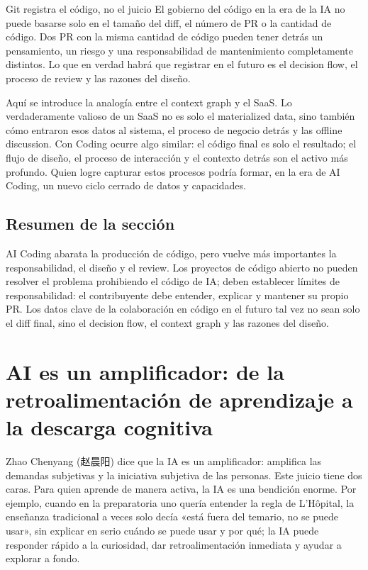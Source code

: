 \documentclass[a4paper]{article}
\begin{document}
\begin{warningbox}{Git registra el código, no el juicio}
El gobierno del código en la era de la IA no puede basarse solo en el tamaño del diff, el número de PR o la cantidad de código. Dos PR con la misma cantidad de código pueden tener detrás un pensamiento, un riesgo y una responsabilidad de mantenimiento completamente distintos. Lo que en verdad habrá que registrar en el futuro es el decision flow, el proceso de review y las razones del diseño.
\end{warningbox}

Aquí se introduce la analogía entre el context graph y el SaaS. Lo verdaderamente valioso de un SaaS no es solo el materialized data, sino también cómo entraron esos datos al sistema, el proceso de negocio detrás y las offline discussion. Con Coding ocurre algo similar: el código final es solo el resultado; el flujo de diseño, el proceso de interacción y el contexto detrás son el activo más profundo. Quien logre capturar estos procesos podría formar, en la era de AI Coding, un nuevo ciclo cerrado de datos y capacidades.

\subsection{Resumen de la sección}

AI Coding abarata la producción de código, pero vuelve más importantes la responsabilidad, el diseño y el review. Los proyectos de código abierto no pueden resolver el problema prohibiendo el código de IA; deben establecer límites de responsabilidad: el contribuyente debe entender, explicar y mantener su propio PR. Los datos clave de la colaboración en código en el futuro tal vez no sean solo el diff final, sino el decision flow, el context graph y las razones del diseño.
\section{AI es un amplificador: de la retroalimentación de aprendizaje a la descarga cognitiva}

Zhao Chenyang (赵晨阳) dice que la IA es un amplificador: amplifica las demandas subjetivas y la iniciativa subjetiva de las personas. Este juicio tiene dos caras. Para quien aprende de manera activa, la IA es una bendición enorme. Por ejemplo, cuando en la preparatoria uno quería entender la regla de L'Hôpital, la enseñanza tradicional a veces solo decía «está fuera del temario, no se puede usar», sin explicar en serio cuándo se puede usar y por qué; la IA puede responder rápido a la curiosidad, dar retroalimentación inmediata y ayudar a explorar a fondo.
\end{document}
